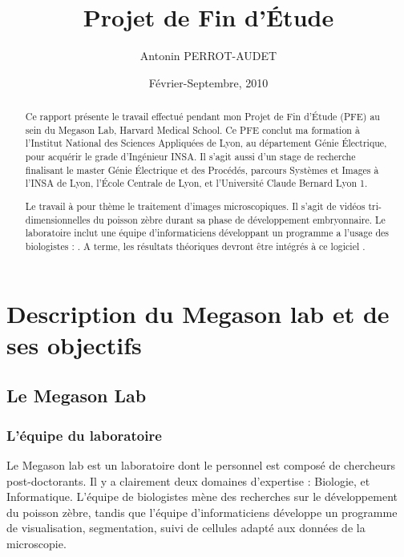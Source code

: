 




\title{Projet de Fin d'Étude}   %
\author{Antonin PERROT-AUDET}         %
\date{Février-Septembre, 2010}    %
\maketitle

\begin{abstract}
  Ce rapport présente le travail effectué pendant mon Projet de Fin d'Étude (PFE) au sein du Megason Lab, Harvard Medical School. Ce PFE conclut ma formation à l'Institut National des Sciences Appliquées de Lyon, au département Génie Électrique, pour acquérir le grade d'Ingénieur INSA. Il s'agit aussi d'un stage de recherche finalisant le master Génie Électrique et des Procédés, parcours Systèmes et Images à l'INSA de Lyon, l'École Centrale de Lyon, et l'Université Claude Bernard Lyon 1.

  Le travail à pour thème le traitement d'images microscopiques. Il s'agit de vidéos tri-dimensionnelles du poisson zèbre durant sa phase de développement embryonnaire. Le laboratoire inclut une équipe d'informaticiens développant un programme a l'usage des biologistes : {\gofigure}\cite{refGofigure2}. A terme, les résultats théoriques devront être intégrés à ce logiciel .
  
  
\tableofcontents  
  
 
\end{abstract}



\chapter{Description du Megason lab et de ses objectifs} 

\section{Le Megason Lab}

\subsection{L'équipe du laboratoire}
Le Megason lab est un laboratoire dont le personnel est composé de chercheurs post-doctorants.
Il y a clairement deux domaines d'expertise : Biologie, et Informatique.
L'équipe de biologistes mène des recherches sur le développement du poisson zèbre,
tandis que l'équipe d'informaticiens développe un programme de visualisation,
segmentation, suivi de cellules adapté aux données de la microscopie.

